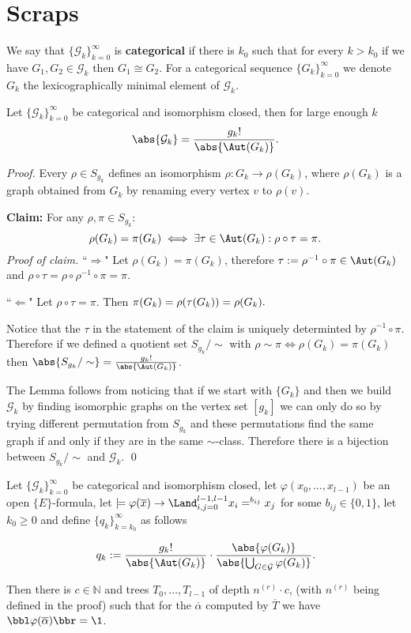 
\chapter*{Scraps}
\begin{defi}
We say that $\{\mathcal{G}_k\}_{k=0}^\infty$ is \textbf{categorical} if there is $k_0$ such that for every $k>k_0$ if we have $G_1,G_2\in\mathcal{G}_k$ then $G_1\cong G_2$. For a categorical sequence $\{G_k\}_{k=0}^\infty$ we denote $G_k$ the lexicographically minimal element of $\mathcal{G}_k$.
\end{defi}

\begin{lemm}
Let $\{\mathcal{G}_k\}_{k=0}^\infty$ be categorical and isomorphism closed, then for large enough $k$
\[\abs{\mathcal{G}_k}=\frac{g_k!}{\abs{\Aut(G_k)}}.\]
\end{lemm}
\begin{proof}
Every $\rho\in S_{g_k}$ defines an isomorphism $\rho:G_k\to\rho(G_k)$, where $\rho(G_k)$ is a graph obtained from $G_k$ by renaming every vertex $v$ to $\rho(v)$.

\textbf{Claim:} For any $\rho,\pi\in S_{g_k}$:
\[\rho(G_k)=\pi(G_k)\iff\exists \tau\in\Aut(G_k):\rho\circ\tau=\pi.\]
\textit{Proof of claim.} ``$\Rightarrow$" Let $\rho(G_k)=\pi(G_k)$, therefore $\tau:=\rho^{-1}\circ\pi\in\Aut(G_k)$ and $\rho\circ\tau=\rho\circ\rho^{-1}\circ\pi=\pi.$

``$\Leftarrow$" Let $\rho\circ\tau=\pi$. Then $\pi(G_k)=\rho(\tau(G_k))=\rho(G_k). \qedhere$

Notice that the $\tau$ in the statement of the claim is uniquely determinted by $\rho^{-1}\circ\pi$. Therefore if we defined a quotient set $S_{g_k}/\sim$ with $\rho\sim\pi\iff\rho(G_k)=\pi(G_k)$ then $\abs{S_{g_k}/\sim}=\frac{g_k!}{\abs{\Aut(G_k)}}$.

The Lemma follows from noticing that if we start with $\{G_k\}$ and then we build $\mathcal{G}_k$ by finding isomorphic graphs on the vertex set $[g_k]$ we can only do so by trying different permutation from $S_{g_k}$ and these permutations find the same graph if and only if they are in the same $\sim$-class. Therefore there is a bijection between $S_{g_k}/\sim$ and $\mathcal{G}_k$. \qed
\end{proof}

\begin{lemm}
Let $\{\mathcal{G}_k\}_{k=0}^\infty$ be categorical and isomorphism closed, let $\varphi(x_0,\dots,x_{l-1})$ be an open $\{E\}$-formula, let $\models \varphi(\overline x) \to \Land_{i,j=0}^{l-1,l-1}x_i=^{b_{ij}}x_j$ for some $b_{ij}\in\{0,1\}$, let $k_0\geq0$ and define $\{q_k\}_{k=k_0}^\infty$ as follows

\[q_k:=\frac{g_k!}{\abs{\Aut(G_k)}}\cdot\frac{\abs{\varphi(G_k)}}{\abs{\bigcup_{G\in\mathcal{G}}\varphi(G_k)}}.\]

Then there is $c\in\mathbb{N}$ and trees $T_0,\dots,T_{l-1}$ of depth $n^{(r)} \cdot c$, (with $n^{(r)}$ being defined in the proof) such that for the $\overline \alpha$ computed by $\overline T$ we have $\bbl\varphi(\overline \alpha)\bbr=\1$.
\end{lemm}

